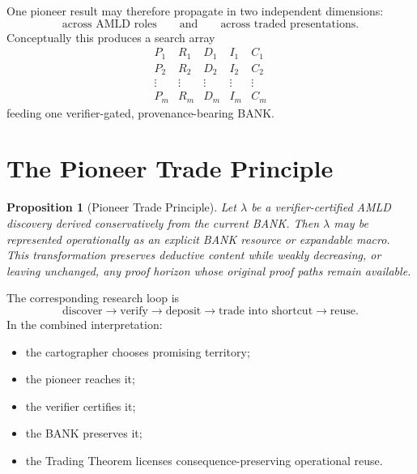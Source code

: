 \documentclass[11pt]{article}
\newtheorem{proposition}[definition]{Proposition}
\theoremstyle{remark}
\begin{document}
One pioneer result may therefore propagate in two independent dimensions:
\[
\text{across AMLD roles}\qquad\text{and}\qquad\text{across traded presentations}.
\]
Conceptually this produces a search array
\[
\begin{array}{ccccc}
P_1&R_1&D_1&I_1&C_1\\
P_2&R_2&D_2&I_2&C_2\\
\vdots&\vdots&\vdots&\vdots&\vdots\\
P_m&R_m&D_m&I_m&C_m
\end{array}
\]
feeding one verifier-gated, provenance-bearing BANK.

\section{The Pioneer Trade Principle}
\begin{proposition}[Pioneer Trade Principle]
Let $\lambda$ be a verifier-certified AMLD discovery derived conservatively from the current BANK. Then $\lambda$ may be represented operationally as an explicit BANK resource or expandable macro. This transformation preserves deductive content while weakly decreasing, or leaving unchanged, any proof horizon whose original proof paths remain available.
\end{proposition}
The corresponding research loop is
\[
\text{discover}\to\text{verify}\to\text{deposit}\to\text{trade into shortcut}\to\text{reuse}.
\]
In the combined interpretation:
\begin{itemize}
\item the cartographer chooses promising territory;
\item the pioneer reaches it;
\item the verifier certifies it;
\item the BANK preserves it;
\item the Trading Theorem licenses consequence-preserving operational reuse.
\end{itemize}
\end{document}
